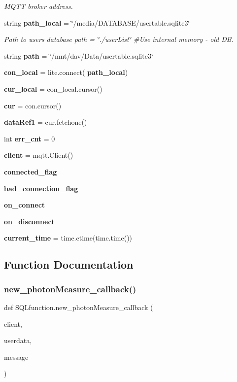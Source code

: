 \begin{DoxyCompactItemize}
\begin{DoxyCompactList}\small\item\em M\+Q\+TT broker address. \end{DoxyCompactList}\item 
string \textbf{ path\+\_\+local} = \char`\"{}/media/D\+A\+T\+A\+B\+A\+SE/usertable.\+sqlite3\char`\"{}
\begin{DoxyCompactList}\small\item\em Path to users database path = \char`\"{}./user\+List\char`\"{} \#\+Use internal memory -\/ old DB. \end{DoxyCompactList}\item 
string \textbf{ path} = \char`\"{}/mnt/dav/Data/usertable.\+sqlite3\char`\"{}
\item 
\textbf{ con\+\_\+local} = lite.\+connect(\textbf{ path\+\_\+local})
\item 
\textbf{ cur\+\_\+local} = con\+\_\+local.\+cursor()
\item 
\textbf{ cur} = con.\+cursor()
\item 
\textbf{ data\+Ref1} = cur.\+fetchone()
\item 
int \textbf{ err\+\_\+cnt} = 0
\item 
\textbf{ client} = mqtt.\+Client()
\item 
\textbf{ connected\+\_\+flag}
\item 
\textbf{ bad\+\_\+connection\+\_\+flag}
\item 
\textbf{ on\+\_\+connect}
\item 
\textbf{ on\+\_\+disconnect}
\item 
\textbf{ current\+\_\+time} = time.\+ctime(time.\+time())
\end{DoxyCompactItemize}


\subsection{Function Documentation}
\mbox{\label{namespace_s_q_lfunction_a356dd5906768f7dd778408f466e9f9b4}} 
\subsubsection{new\+\_\+photon\+Measure\+\_\+callback()}
{\footnotesize\ttfamily def S\+Q\+Lfunction.\+new\+\_\+photon\+Measure\+\_\+callback (\begin{DoxyParamCaption}\item[{}]{client,  }\item[{}]{userdata,  }\item[{}]{message }\end{DoxyParamCaption})}



